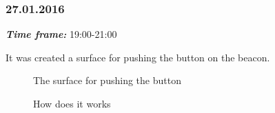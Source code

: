 \subsubsection{27.01.2016}
\textit{\textbf{Time frame:}} 19:00-21:00

It was created a surface for pushing the button on the beacon.

\begin{figure}[H]
	\begin{minipage}[h]{0.58\linewidth}
		\caption{The surface for pushing the button}
	\end{minipage}
	\hfill
	\begin{minipage}[h]{0.37\linewidth}
		\caption{How does it works}
	\end{minipage}
\end{figure}
